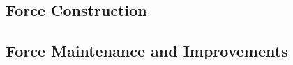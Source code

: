 

\subsection{Force Construction}
\label{subsec:force_construction}



\newpage



\newpage

\subsection{Force Maintenance and Improvements}
\label{subsec:force_maintenance}



